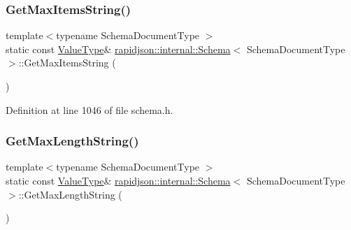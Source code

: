\subsubsection{\texorpdfstring{GetMaxItemsString()}{GetMaxItemsString()}}
{\footnotesize\ttfamily template$<$typename Schema\+Document\+Type $>$ \\
static const \mbox{\hyperlink{classrapidjson_1_1internal_1_1_schema_a3979a9083c598195927c08c6e3ba91d1}{Value\+Type}}\& \mbox{\hyperlink{classrapidjson_1_1internal_1_1_schema}{rapidjson\+::internal\+::\+Schema}}$<$ Schema\+Document\+Type $>$\+::Get\+Max\+Items\+String (\begin{DoxyParamCaption}{ }\end{DoxyParamCaption})\hspace{0.3cm}{\ttfamily [static]}}



Definition at line 1046 of file schema.\+h.


\begin{DoxyCode}{0}

\end{DoxyCode}
\mbox{\label{classrapidjson_1_1internal_1_1_schema_ac30a2e2115108503b04d6acf53194bfa}} 
\subsubsection{\texorpdfstring{GetMaxLengthString()}{GetMaxLengthString()}}
{\footnotesize\ttfamily template$<$typename Schema\+Document\+Type $>$ \\
static const \mbox{\hyperlink{classrapidjson_1_1internal_1_1_schema_a3979a9083c598195927c08c6e3ba91d1}{Value\+Type}}\& \mbox{\hyperlink{classrapidjson_1_1internal_1_1_schema}{rapidjson\+::internal\+::\+Schema}}$<$ Schema\+Document\+Type $>$\+::Get\+Max\+Length\+String (\begin{DoxyParamCaption}{ }\end{DoxyParamCaption})\hspace{0.3cm}{\ttfamily [static]}}



